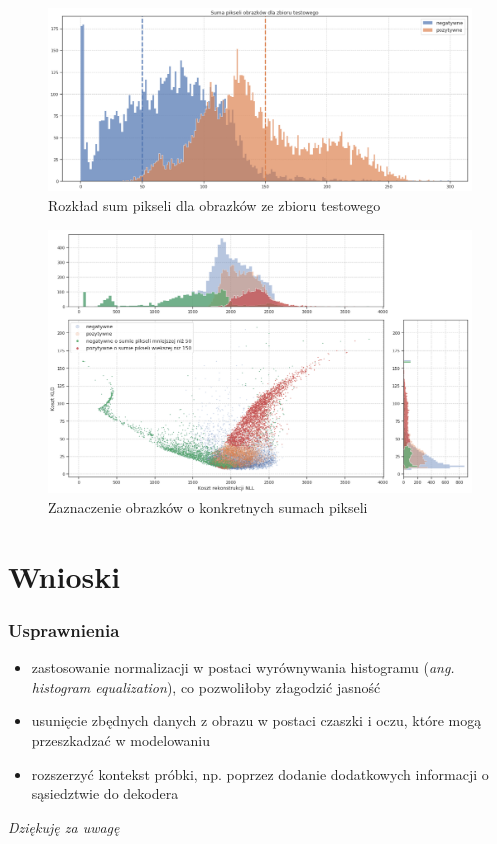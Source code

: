 \documentclass[polish, 13pt]{beamer}
\begin{document}
\begin{frame}
\begin{figure}
    \centering
    \includegraphics[width=1.0\textwidth]{images/pixels_hist_v3}
    \caption{Rozkład sum pikseli dla obrazków ze zbioru testowego}
\end{figure}
\end{frame}

\begin{frame}
 \begin{figure}
    \centering
    \includegraphics[width=1.0\textwidth]{images/soft_vae_th_v3}
    \caption{Zaznaczenie obrazków o konkretnych sumach pikseli}
    \label{fig:soft_vae_th}
\end{figure}
\end{frame}

\section{Wnioski}

\begin{frame}
 \frametitle{Usprawnienia}
  \begin{itemize}
  \item zastosowanie normalizacji w postaci wyrównywania histogramu (\textit{ang. histogram equalization}), co pozwoliłoby złagodzić jasność
  \item usunięcie zbędnych danych z obrazu w postaci czaszki i oczu, które mogą przeszkadzać w modelowaniu
  \item rozszerzyć kontekst próbki, np. poprzez dodanie dodatkowych informacji o sąsiedztwie do dekodera
 \end{itemize}
\end{frame}


\begin{frame}{}
  \centering \Large
  \emph{Dziękuję za uwagę}
\end{frame}
\end{document}
